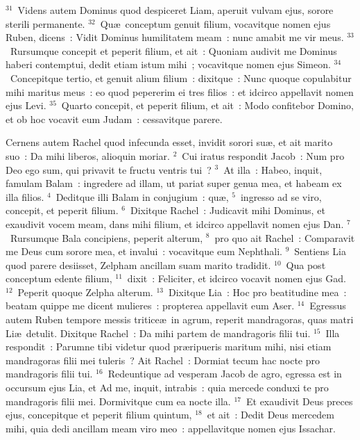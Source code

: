 ${}^{31}$~Videns autem Dominus quod despiceret Liam, aperuit vulvam ejus, sorore sterili permanente.
${}^{32}$~Qu\ae\ conceptum genuit filium, vocavitque nomen ejus Ruben, dicens~: Vidit Dominus humilitatem meam~: nunc amabit me vir meus.
${}^{33}$~Rursumque concepit et peperit filium, et ait~: Quoniam audivit me Dominus haberi contemptui, dedit etiam istum mihi~; vocavitque nomen ejus Simeon.
${}^{34}$~Concepitque tertio, et genuit alium filium~: dixitque~: Nunc quoque copulabitur mihi maritus meus~: eo quod pepererim ei tres filios~: et idcirco appellavit nomen ejus Levi.
${}^{35}$~Quarto concepit, et peperit filium, et ait~: Modo confitebor Domino, et ob hoc vocavit eum Judam~: cessavitque parere.

\lettrine[lines=3,image=true,loversize=0.05,lraise=-0.03]{C}{}ernens autem Rachel quod infecunda esset, invidit sorori su\ae , et ait marito suo~: Da mihi liberos, alioquin moriar.
${}^{2}$~Cui iratus respondit Jacob~: Num pro Deo ego sum, qui privavit te fructu ventris tui~?
${}^{3}$~At illa~: Habeo, inquit, famulam Balam~: ingredere ad illam, ut pariat super genua mea, et habeam ex illa filios.
${}^{4}$~Deditque illi Balam in conjugium~: qu\ae ,
${}^{5}$~ingresso ad se viro, concepit, et peperit filium.
${}^{6}$~Dixitque Rachel~: Judicavit mihi Dominus, et exaudivit vocem meam, dans mihi filium, et idcirco appellavit nomen ejus Dan.
${}^{7}$~Rursumque Bala concipiens, peperit alterum,
${}^{8}$~pro quo ait Rachel~: Comparavit me Deus cum sorore mea, et invalui~: vocavitque eum Nephthali.
${}^{9}$~Sentiens Lia quod parere desiisset, Zelpham ancillam suam marito tradidit.
${}^{10}$~Qua post conceptum edente filium,
${}^{11}$~dixit~: Feliciter, et idcirco vocavit nomen ejus Gad.
${}^{12}$~Peperit quoque Zelpha alterum.
${}^{13}$~Dixitque Lia~: Hoc pro beatitudine mea~: beatam quippe me dicent mulieres~: propterea appellavit eum Aser.
${}^{14}$~Egressus autem Ruben tempore messis tritice\ae\ in agrum, reperit mandragoras, quas matri Li\ae\ detulit. Dixitque Rachel~: Da mihi partem de mandragoris filii tui.
${}^{15}$~Illa respondit~: Parumne tibi videtur quod pr\ae ripueris maritum mihi, nisi etiam mandragoras filii mei tuleris~? Ait Rachel~: Dormiat tecum hac nocte pro mandragoris filii tui.
${}^{16}$~Redeuntique ad vesperam Jacob de agro, egressa est in occursum ejus Lia, et Ad me, inquit, intrabis~: quia mercede conduxi te pro mandragoris filii mei. Dormivitque cum ea nocte illa.
${}^{17}$~Et exaudivit Deus preces ejus, concepitque et peperit filium quintum,
${}^{18}$~et ait~: Dedit Deus mercedem mihi, quia dedi ancillam meam viro meo~: appellavitque nomen ejus Issachar.
